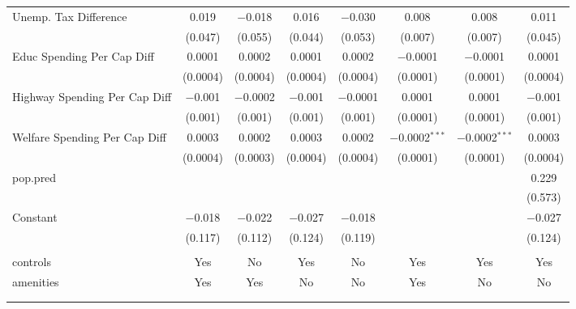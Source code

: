\begin{table}[!htbp]
\begin{tabular}{@{\extracolsep{5pt}}lccccccc}
  Unemp. Tax Difference & 0.019 & $-$0.018 & 0.016 & $-$0.030 & 0.008 & 0.008 & 0.011 \\ 
  & (0.047) & (0.055) & (0.044) & (0.053) & (0.007) & (0.007) & (0.045) \\ 
  Educ Spending Per Cap Diff & 0.0001 & 0.0002 & 0.0001 & 0.0002 & $-$0.0001 & $-$0.0001 & 0.0001 \\ 
  & (0.0004) & (0.0004) & (0.0004) & (0.0004) & (0.0001) & (0.0001) & (0.0004) \\ 
  Highway Spending Per Cap Diff & $-$0.001 & $-$0.0002 & $-$0.001 & $-$0.0001 & 0.0001 & 0.0001 & $-$0.001 \\ 
  & (0.001) & (0.001) & (0.001) & (0.001) & (0.0001) & (0.0001) & (0.001) \\ 
  Welfare Spending Per Cap Diff & 0.0003 & 0.0002 & 0.0003 & 0.0002 & $-$0.0002$^{***}$ & $-$0.0002$^{***}$ & 0.0003 \\ 
  & (0.0004) & (0.0003) & (0.0004) & (0.0004) & (0.0001) & (0.0001) & (0.0004) \\ 
  pop.pred &  &  &  &  &  &  & 0.229 \\ 
  &  &  &  &  &  &  & (0.573) \\ 
  Constant & $-$0.018 & $-$0.022 & $-$0.027 & $-$0.018 &  &  & $-$0.027 \\ 
  & (0.117) & (0.112) & (0.124) & (0.119) &  &  & (0.124) \\ 
 \hline \\[-1.8ex] 
controls & Yes & No & Yes & No & Yes & Yes & Yes \\ 
amenities & Yes & Yes & No & No & Yes & No & No \\ 
\hline \\[-1.8ex] 
\hline 
\hline \\[-1.8ex] 
\end{tabular} 
\end{table} 
